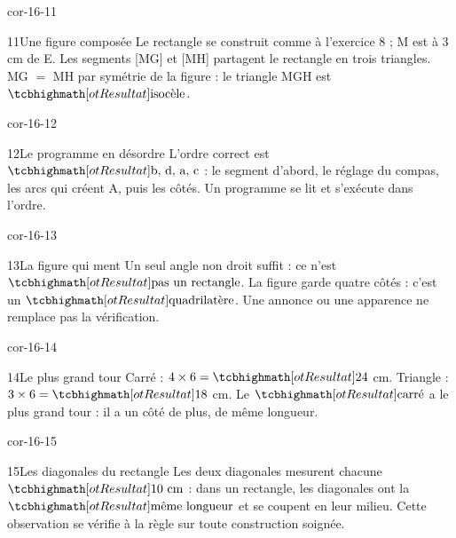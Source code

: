 \begin{blocLivre}{cor-16-11}\begin{corrige}{11}{Une figure composée}
Le rectangle se construit comme à l’exercice 8 ; M est à 3 cm de E. Les segments [MG] et [MH] partagent le rectangle en trois triangles. MG $=$ MH par symétrie de la figure : le triangle MGH est $\res{\text{isocèle}}$.
\label{fig-cor-16-11}
\end{corrige}\end{blocLivre}
\begin{blocLivre}{cor-16-12}\begin{corrige}{12}{Le programme en désordre}
L’ordre correct est $\res{\text{b, d, a, c}}$ : le segment d’abord, le réglage du compas, les arcs qui créent A, puis les côtés. Un programme se lit et s’exécute dans l’ordre.
\label{fig-cor-16-12}
\end{corrige}\end{blocLivre}
\begin{blocLivre}{cor-16-13}\begin{corrige}{13}{La figure qui ment}
Un seul angle non droit suffit : ce n’est $\res{\text{pas un rectangle}}$. La figure garde quatre côtés : c’est un $\res{\text{quadrilatère}}$. Une annonce ou une apparence ne remplace pas la vérification.
\label{fig-cor-16-13}
\end{corrige}\end{blocLivre}
\begin{blocLivre}{cor-16-14}\begin{corrige}{14}{Le plus grand tour}
Carré : $4\times6=\res{24}$ cm. Triangle : $3\times6=\res{18}$ cm. Le $\res{\text{carré}}$ a le plus grand tour : il a un côté de plus, de même longueur.
\label{fig-cor-16-14}
\end{corrige}\end{blocLivre}
\begin{blocLivre}{cor-16-15}\begin{corrige}{15}{Les diagonales du rectangle}
Les deux diagonales mesurent chacune $\res{10\ \mathrm{cm}}$ : dans un rectangle, les diagonales ont la $\res{\text{même longueur}}$ et se coupent en leur milieu. Cette observation se vérifie à la règle sur toute construction soignée.
\label{fig-cor-16-15}
\end{corrige}\end{blocLivre}
